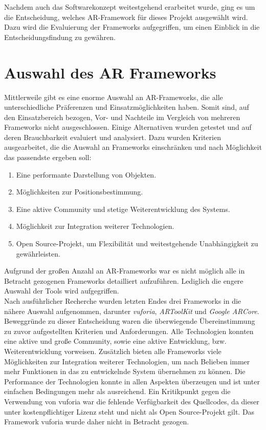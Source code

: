 Nachdem auch das Softwarekonzept weitestgehend erarbeitet wurde, ging es um die Entscheidung, welches \acl{AR}-Framework für dieses Projekt 
ausgewählt wird. Dazu wird die Evaluierung der Frameworks aufgegriffen, um einen Einblick in die Entscheidungsfindung zu gewähren.
\section{Auswahl des AR Frameworks}
\label{chap:Auswahl des AR Frameworks}
Mittlerweile gibt es eine enorme Auswahl an \acs{AR}-Frameworks, die alle unterschiedliche Präferenzen und 
Einsatzmöglichkeiten haben. Somit sind, auf den Einsatzbereich bezogen, Vor- und Nachteile im Vergleich von mehreren Frameworks nicht ausgeschlossen. 
Einige Alternativen wurden getestet und auf deren Brauchbarkeit evaluiert und analysiert. Dazu wurden Kriterien ausgearbeitet, die die 
Auswahl an Frameworks einschränken und nach Möglichkeit das passendste ergeben soll: 
\begin{enumerate}
    \item Eine performante Darstellung von Objekten.
    \item Möglichkeiten zur Positionsbestimmung.
    \item Eine aktive Community und stetige Weiterentwicklung des Systems.
    \item Möglichkeit zur Integration weiterer Technologien.
    \item Open Source-Projekt, um Flexibilität und weitestgehende Unabhängigkeit zu gewährleisten.
\end{enumerate}
Aufgrund der großen Anzahl an \acs{AR}-Frameworks war es nicht möglich alle in Betracht gezogenen Frameworks detailliert aufzuführen. 
Lediglich die engere Auswahl der Tools wird aufgegriffen. 
\\ 
Nach ausführlicher Recherche wurden letzten Endes drei Frameworks in die nähere Auswahl aufgenommen, darunter \textit{vuforia}, 
\textit{ARToolKit} und \textit{Google ARCore}. Beweggründe zu dieser Entscheidung waren die überwiegende 
Übereinstimmung zu zuvor aufgestellten Kriterien und Anforderungen. Alle Technologien konnten eine aktive und große Community, sowie eine 
aktive Entwicklung, bzw. Weiterentwicklung vorweisen. Zusätzlich bieten alle Frameworks viele Möglichkeiten zur Integration weiterer 
Technologien, um nach Belieben immer mehr Funktionen in das zu entwickelnde System übernehmen zu können. Die Performance der Technologien konnte 
in allen Aspekten überzeugen und ist unter einfachen Bedingungen mehr als ausreichend. Ein Kritikpunkt gegen die Verwendung von vuforia war 
die fehlende Verfügbarkeit des Quellcodes, da dieser unter kostenpflichtiger Lizenz steht und nicht als Open Source-Projekt gilt. Das Framework 
vuforia wurde daher nicht in Betracht gezogen.
